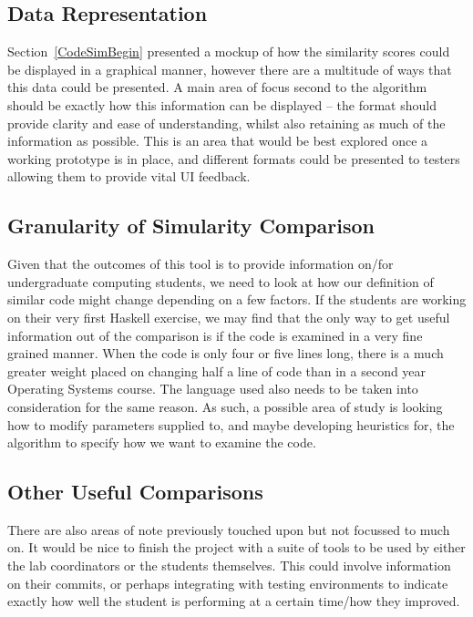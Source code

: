 \subsection{Data Representation}

Section~\ref{CodeSimBegin} presented a mockup of how the similarity scores could
be displayed in a graphical manner, however there are a multitude of ways that
this data could be presented. A main area of focus second to the algorithm should
be exactly how this information can be displayed -- the format should provide
clarity and ease of understanding, whilst also retaining as much of the information
as possible. This is an area that would be best explored once a working prototype
is in place, and different formats could be presented to testers allowing them
to provide vital UI feedback.

\subsection{Granularity of Simularity Comparison}
\label{subsec:SimGranularity}

Given that the outcomes of this tool is to provide information on/for undergraduate
computing students, we need to look at how our definition of similar code might
change depending on a few factors. If the students are working on their very first
Haskell exercise, we may find that the only way to get useful information out
of the comparison is if the code is examined in a very fine grained manner. When
the code is only four or five lines long, there is a much greater weight placed
on changing half a line of code than in a second year Operating Systems course.
The language used also needs to be taken into consideration for the same reason.
As such, a possible area of study is looking how to modify parameters supplied
to, and maybe developing heuristics for, the algorithm to specify how we want
to examine the code.

\subsection{Other Useful Comparisons}

There are also areas of note previously touched upon but not focussed to much on.
It would be nice to finish the project with a suite of tools to be used by either
the lab coordinators or the students themselves. This could involve information
on their commits, or perhaps integrating with testing environments to indicate
exactly how well the student is performing at a certain time/how they improved.